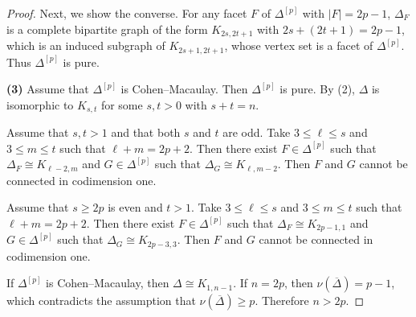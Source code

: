 \documentclass[10pt,a4paper]{amsart}
\begin{document}
\begin{proof}
Next, we show the converse.
For any facet $F$ of $\Delta^{[p]}$ with $|F| = 2p-1$,
$\Delta_F$ is a complete bipartite graph of the form $K_{2s,2t+1}$ with $2s + (2t+1) = 2p-1$, which is an induced subgraph of $K_{2s+1,2t+1}$,
whose vertex set is a facet of $\Delta^{[p]}$. Thus $\Delta^{[p]}$ is pure.

\textbf{(3)}
Assume that $\Delta^{[p]}$ is Cohen--Macaulay.
Then $\Delta^{[p]}$ is pure.
By (2), $\Delta$ is isomorphic to $K_{s,t}$ for some $s,t > 0$ with $s + t = n$.

Assume that $s,t > 1$ and that both $s$ and $t$ are odd.
Take $3 \le \ell \le s$ and $3 \le m \le t$ such that $\ell + m = 2p+2$.
Then there exist $F \in \Delta^{[p]}$ such that $\Delta_F \cong K_{\ell-2,m}$
and $G \in \Delta^{[p]}$ such that $\Delta_G \cong K_{\ell,m-2}$.
Then $F$ and $G$ cannot be connected in codimension one.

Assume that $s \ge 2p$ is even and $t > 1$.
Take $3 \le \ell \le s$ and $3 \le m \le t$ such that $\ell + m = 2p+2$.
Then there exist $F \in \Delta^{[p]}$ such that $\Delta_F \cong K_{2p-1,1}$
and $G \in \Delta^{[p]}$ such that $\Delta_G \cong K_{2p-3,3}$.
Then $F$ and $G$ cannot be connected in codimension one.

If $\Delta^{[p]}$ is Cohen--Macaulay, then $\Delta \cong K_{1,n-1}$.
If $n = 2p$, then $\nu(\overline{\Delta}) = p-1$, which contradicts the assumption that $\nu(\overline{\Delta}) \ge p$. Therefore $n > 2p$.
\end{proof}
\end{document}
